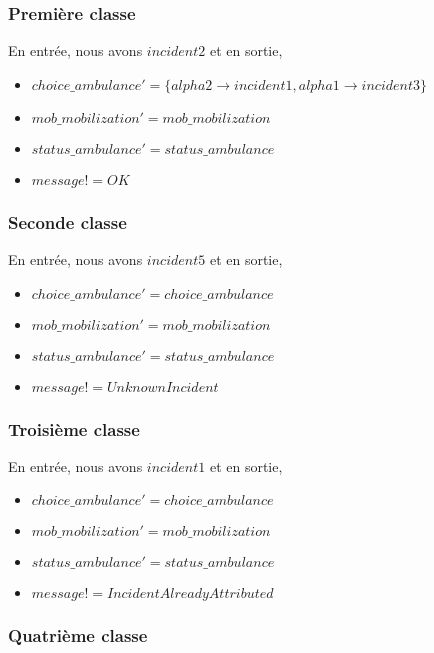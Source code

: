 \documentclass{report}
\begin{document}
\subsubsection{Première classe}

En entrée, nous avons $incident2$ et en sortie, 
\begin{itemize}
	\item $choice\_ambulance' = \{alpha2 \rightarrow incident1, alpha1 \rightarrow incident3 \}$
	\item $mob\_mobilization' = mob\_mobilization$
	\item $status\_ambulance' = status\_ambulance$
	\item $message! = OK$
\end{itemize}

\subsubsection{Seconde classe}

En entrée, nous avons $incident5$ et en sortie, 
\begin{itemize}
	\item $choice\_ambulance' = choice\_ambulance$
	\item $mob\_mobilization' = mob\_mobilization$
	\item $status\_ambulance' = status\_ambulance$
	\item $message! = UnknownIncident$
\end{itemize}

\subsubsection{Troisième classe}

En entrée, nous avons $incident1$ et en sortie, 
\begin{itemize}
	\item $choice\_ambulance' = choice\_ambulance$
	\item $mob\_mobilization' = mob\_mobilization$
	\item $status\_ambulance' = status\_ambulance$
	\item $message! = IncidentAlreadyAttributed$
\end{itemize}

\subsubsection{Quatrième classe}
\end{document}
